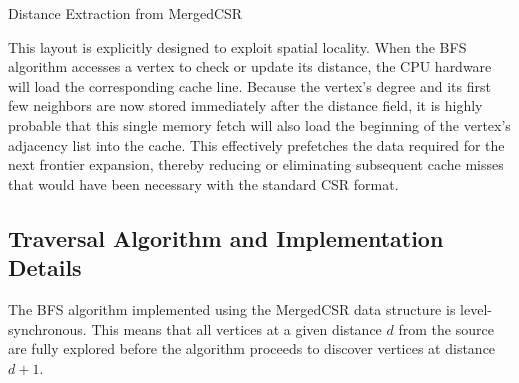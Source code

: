 \begin{algorithm}[H]
    \BlankLine
    \;
\end{algorithm}
\begin{algorithm}[H]
    
    \caption{Distance Extraction from MergedCSR}
    \label{alg:extract_distances}

    \BlankLine
    \BlankLine
    
    \;
\end{algorithm}

This layout is explicitly designed to exploit spatial locality. When the BFS algorithm accesses a vertex to check or update its distance, the CPU hardware will load the corresponding cache line. Because the vertex's degree and its first few neighbors are now stored immediately after the distance field, it is highly probable that this single memory fetch will also load the beginning of the vertex's adjacency list into the cache. This effectively prefetches the data required for the next frontier expansion, thereby reducing or eliminating subsequent cache misses that would have been necessary with the standard CSR format.

\subsection{Traversal Algorithm and Implementation Details}

The BFS algorithm implemented using the MergedCSR data structure is level-synchronous. This means that all vertices at a given distance $d$ from the source are fully explored before the algorithm proceeds to discover vertices at distance $d+1$.

